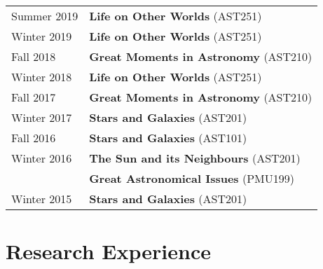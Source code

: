 \documentclass[10pt]{res} %
\begin{document}
\begin{resume}
\begin{table}[h!]
\begin{tabularx}{\textwidth}{ @{} p{6.5em} X @{} }
Summer 2019 & \textbf{Life on Other Worlds} (AST251) \\
Winter 2019    & \textbf{Life on Other Worlds} (AST251) \\
Fall 2018         & \textbf{Great Moments in Astronomy} (AST210) \\
Winter 2018    & \textbf{Life on Other Worlds} (AST251) \\
Fall 2017         & \textbf{Great Moments in Astronomy} (AST210) \\
Winter 2017    & \textbf{Stars and Galaxies} (AST201) \\
Fall 2016         & \textbf{Stars and Galaxies} (AST101) \\
Winter 2016    & \textbf{The Sun and its Neighbours} (AST201) \\
                        & \textbf{Great Astronomical Issues} (PMU199) \\
Winter 2015    & \textbf{Stars and Galaxies} (AST201)
\end{tabularx}
\end{table}


\section{\Large Research Experience}
\vspace{-5pt} %
\noindent\makebox[\linewidth]{\rule{\textwidth}{0.4pt}}
\vspace{-20pt} %


\end{resume}
\end{document}
